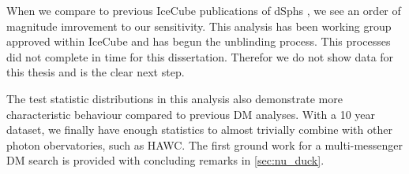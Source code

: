 When we compare to previous IceCube publications of dSphs \cite{IC3_DM2013}, we see an order of magnitude imrovement to our sensitivity.
This analysis has been working group approved within IceCube and has begun the unblinding process.
This processes did not complete in time for this dissertation.
Therefor we do not show data for this thesis and is the clear next step.

The test statistic distributions in this analysis also demonstrate more characteristic behaviour compared to previous DM analyses.
With a 10 year dataset, we finally have enough statistics to almost trivially combine with other photon obervatories, such as HAWC.
The first ground work for a multi-messenger DM search is provided with concluding remarks in \cref{sec:nu_duck}.